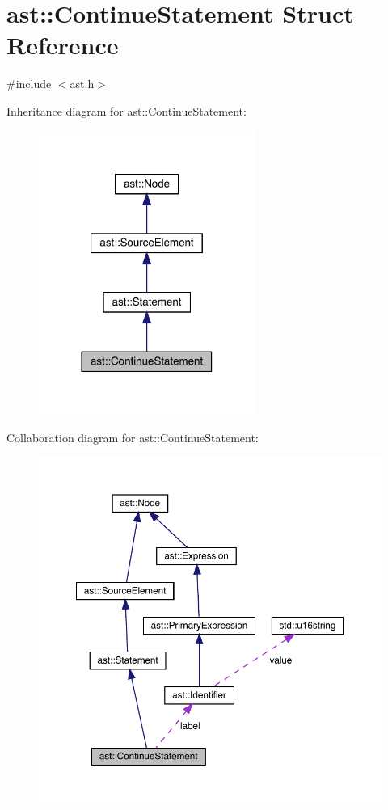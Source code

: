 \hypertarget{structast_1_1_continue_statement}{}\section{ast\+:\+:Continue\+Statement Struct Reference}
\label{structast_1_1_continue_statement}


{\ttfamily \#include $<$ast.\+h$>$}



Inheritance diagram for ast\+:\+:Continue\+Statement\+:\nopagebreak
\begin{figure}[H]
\begin{center}
\leavevmode
\includegraphics[width=201pt]{structast_1_1_continue_statement__inherit__graph}
\end{center}
\end{figure}


Collaboration diagram for ast\+:\+:Continue\+Statement\+:\nopagebreak
\begin{figure}[H]
\begin{center}
\leavevmode
\includegraphics[width=350pt]{structast_1_1_continue_statement__coll__graph}
\end{center}
\end{figure}
